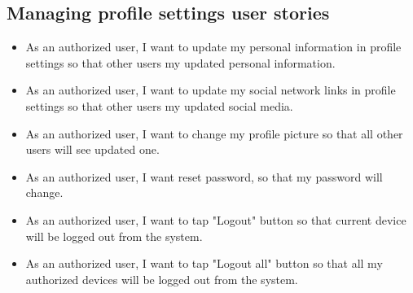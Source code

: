 \subsection{Managing profile settings user stories}\label{subsec:profile-settings-user-stories}
\begin{itemize}
    \item As an authorized user, I want to update my personal information in profile settings so that other users my
    updated personal information.
    \item As an authorized user, I want to update my social network links in profile settings so that other users
    my updated social media.
    \item As an authorized user, I want to change my profile picture so that all other users will see updated one.
    \item As an authorized user, I want reset password, so that my password will change.
    \item As an authorized user, I want to tap "Logout" button so that current device will be logged out from the system.
    \item As an authorized user, I want to tap "Logout all" button so that all my authorized devices will be logged out
    from the system.
\end{itemize}
